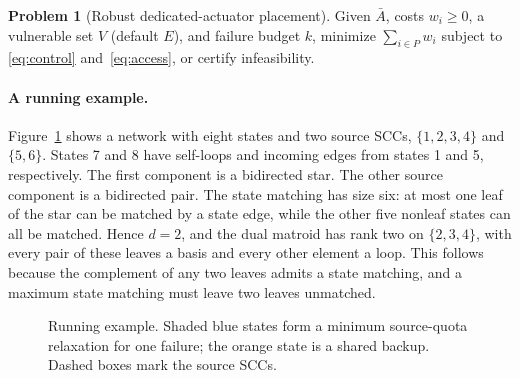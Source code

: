 \documentclass[11pt]{article}
\theoremstyle{definition}
\newtheorem{problem}[theorem]{Problem}
\theoremstyle{remark}\newtheorem{remark}[theorem]{Remark}
\begin{document}
\begin{problem}[Robust dedicated-actuator placement]\label{prob:control}
Given $\bar A$, costs $w_i\ge0$, a vulnerable set $V$ (default $E$),
and failure budget $k$, minimize $\sum_{i\in P}w_i$ subject to
\eqref{eq:control} and~\eqref{eq:access}, or certify infeasibility.
\end{problem}


\paragraph{A running example.}
Figure~\ref{fig:running} shows a network with eight states and two
source SCCs, $\{1,2,3,4\}$ and $\{5,6\}$. States 7 and 8 have
self-loops and incoming edges from states 1 and 5, respectively.
The first component is a bidirected star. The other source component
is a bidirected pair. The state matching has size six: at most one
leaf of the star can be matched by a state edge, while the other five
nonleaf states can all be matched. Hence $d=2$, and the dual matroid
has rank two on $\{2,3,4\}$, with every pair of these leaves a basis
and every other element a loop. This follows because the complement
of any two leaves admits a state matching, and a maximum state
matching must leave two leaves unmatched.

\begin{figure}[htbp]
\centering
{}
\caption{Running example. Shaded blue states form a minimum
source-quota relaxation for one failure; the orange state is a
shared backup. Dashed boxes mark the source SCCs.}
\label{fig:running}
\end{figure}
\end{document}
